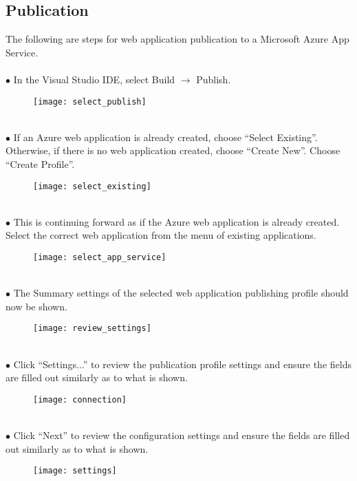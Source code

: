 \subsection{Publication}

The following are steps for web application publication to a Microsoft Azure App Service.\\
    
    \ \\
    $\bullet$ In the Visual Studio IDE, select Build $\rightarrow$ Publish.
    \begin{figure}[H] 
        \centering
        \texttt{[image: select\_publish]}
    \end{figure}
    
    \ \\
    $\bullet$ If an Azure web application is already created, choose ``Select Existing''.  Otherwise, if there is no web application created, choose ``Create New''.  Choose ``Create Profile''.
    \begin{figure}[H] 
        \centering
        \texttt{[image: select\_existing]}
    \end{figure}
        
    \ \\
    $\bullet$ This is continuing forward as if the Azure web application is already created. Select the correct web application from the menu of existing applications.
    \begin{figure}[H] 
        \centering
        \texttt{[image: select\_app\_service]}
    \end{figure}
        
    \ \\
    $\bullet$ The Summary settings of the selected web application publishing profile should now be shown.
    \begin{figure}[H] 
        \centering
        \texttt{[image: review\_settings]}
    \end{figure}
    
    \ \\
    $\bullet$ Click ``Settings...'' to review the publication profile settings and ensure the fields are filled out similarly as to what is shown.
    \begin{figure}[H] 
        \centering
        \texttt{[image: connection]}
    \end{figure}
    
    \ \\
    $\bullet$ Click ``Next'' to review the configuration settings and ensure the fields are filled out similarly as to what is shown.
    \begin{figure}[H] 
        \centering
        \texttt{[image: settings]}
    \end{figure}
    
